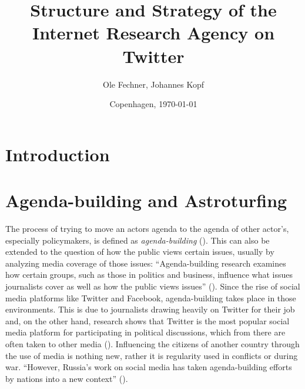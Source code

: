 \documentclass[12pt, titlepage=true, toc=bib]{scrartcl}
\begin{document}
\titlehead{}
\author{Ole Fechner, Johannes Kopf}
\title{Structure and Strategy of the Internet Research Agency on Twitter}


\date{\normalsize{Copenhagen, \today}}

\publishers{}

\maketitle[0]

\newpage

\thispagestyle{empty}
\tableofcontents

\newpage
\setcounter{page}{1}

\section{Introduction}

\section{Agenda-building and Astroturfing}

The process of trying to move an actors agenda to the agenda of other actor's, especially policymakers, is defined as \textit{agenda-building} (\cite[3]{linvill_troll_2018}). This can also be extended to the question of how the public views certain issues, usually by analyzing media coverage of those issues: ``Agenda-building research examines how certain groups, such as those in politics and business, influence what issues journalists cover as well as how the public views issues'' (\cite[434]{parmelee_agenda-building_2014}). Since the rise of social media platforms like Twitter and Facebook, agenda-building takes place in those environments. This is due to journalists drawing heavily on Twitter for their job and, on the other hand, research shows that Twitter is the most popular social media platform for participating in political discussions, which from there are often taken to other media (\cite[435, 437]{parmelee_agenda-building_2014}). Influencing the citizens of another country through the use of media is nothing new, rather it is regularity used in conflicts or during war. ``However, Russia's work on social media has taken agenda-building efforts by nations into a new context'' (\cite[3]{linvill_troll_2018}).
\end{document}
